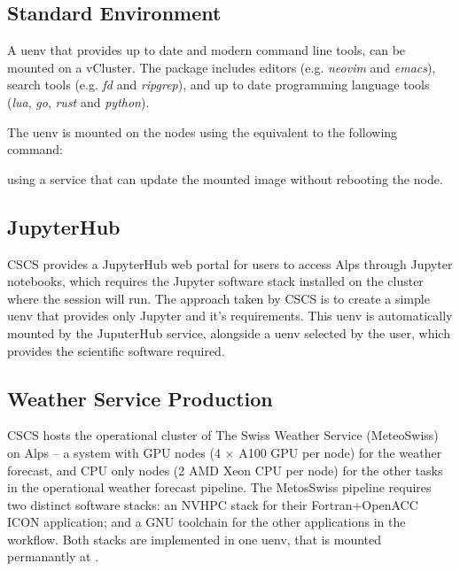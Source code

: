 \subsection{Standard Environment}

A uenv that provides up to date and modern command line tools, can be mounted on a vCluster.
The package includes editors (e.g. \emph{neovim} and \emph{emacs}), search tools (e.g. \emph{fd} and \emph{ripgrep}), and up to date programming language tools (\emph{lua}, \emph{go}, \emph{rust} and \emph{python}).

The uenv is mounted on the nodes using the equivalent to the following command:

using a service that can update the mounted image without rebooting the node.

\subsection{JupyterHub}

CSCS provides a JupyterHub web portal for users to access Alps through Jupyter notebooks, which requires the Jupyter software stack installed on the cluster where the session will run.
The approach taken by CSCS is to create a simple  uenv that provides only Jupyter and it's requirements.
This uenv is automatically mounted by the JuputerHub service, alongside a uenv selected by the user, which provides the scientific software required.

\subsection{Weather Service Production}

CSCS hosts the operational cluster of The Swiss Weather Service (MeteoSwiss) on Alps -- a system with GPU nodes (4 $\times$ A100 GPU per node) for the weather forecast, and CPU only nodes (2 AMD Xeon CPU per node) for the other tasks in the operational weather forecast pipeline.
The MetosSwiss pipeline requires two distinct software stacks: an NVHPC stack for their Fortran+OpenACC ICON application; and a GNU toolchain for the other applications in the workflow.
Both stacks are implemented in one uenv, that is mounted permanantly at .

